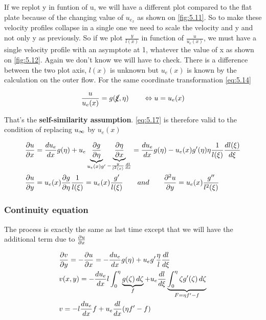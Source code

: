 	If we replot y in funtion of u, we will have a different plot compared to the flat plate because of the changing value of $u_{e_x}$ as shown on \autoref{fig:5.11}. So to make these velocity profiles collapse in a single one we need to scale the velocity and y and not only y as previously. So if we plot $\frac{y}{l(x)}$ in function of $\frac{u}{u_e(x)}$, we must have a single velocity profile with an asymptote at 1, whatever the value of x as shown on \autoref{fig:5.12}. Again we don't know we will have to check. There is a difference between the two plot axis, $l(x)$ is unknown but $u_e(x)$ is known by the calculation on the outer flow. For the same coordinate transformation \eqref{eq:5.14}
	
	\begin{equation}
		\frac{u}{u_e(x)} = g(\cancel{\xi}, \eta)  \qquad \Leftrightarrow u = u_e(x)
	\end{equation}
	
	That's the \textbf{self-similarity assumption}. \eqref{eq:5.17} is therefore valid to the condition of replacing $u_\infty$ by $u_e(x)$
	
	\begin{equation}
		\begin{aligned}
			&\frac{\partial u}{\partial x} = \frac{du_e}{dx}g(\eta ) + u_e\underbrace{\frac{\partial g}{\partial \eta}}_{u_e(x) g'} \underbrace{\frac{\partial \eta}{\partial x}}_{-\frac{y}{l^2(x)}\frac{dl}{dx}} = \frac{du_e}{dx}g(\eta )  - u_e(x) g'(\eta)\eta \frac{1}{l(\xi)} \frac{dl(\xi)}{d\xi}\\
			&\frac{\partial u}{\partial y} = u_e(x)\frac{\partial  g}{\partial \eta} \frac{1}{l(\xi)} = u_e(x) \frac{g'}{l(\xi)} \qquad and \qquad \frac{\partial ^2 u}{\partial y }= u_e(x) \frac{g''}{l^2(\xi)}
		\end{aligned}
		\end{equation}
		
		\subsubsection{Continuity equation}
			The process is exactly the same as last time except that we will have the additional term due to $\frac{\partial u}{\partial x}$ 
			
			\begin{equation}
			\begin{aligned}
				&\frac{\partial v}{\partial y} = -\frac{\partial u}{\partial x} = -\frac{du_e}{dx}g(\eta )  + u_e g'\frac{\eta}{l} \frac{dl}{d\xi} \\
				&v(x,y) = -\frac{du_e}{dx} l \int _0 ^\eta \underbrace{g(\zeta) \, d\zeta }_{f}+ u_e \frac{dl}{d\xi} \underbrace{\int _0 ^\eta \zeta g'(\zeta) \, d\zeta}_{F= \eta f' -f} \\
				&v = -l \frac{du_e}{dx} f + u_e \frac{dl}{dx} (\eta f' - f)
			\end{aligned}
			\end{equation}
			
